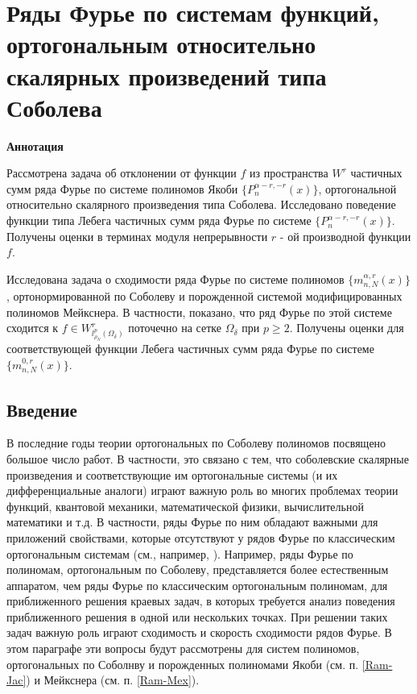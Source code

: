 \chapter{Ряды Фурье по системам функций, ортогональным относительно скалярных произведений типа Соболева}

\begin{center}
\textbf{ Аннотация}
\end{center}
Рассмотрена задача об отклонении от функции $f$ из пространства $W^r$ частичных сумм ряда Фурье по системе полиномов Якоби $\{P_n^{\alpha-r,-r}(x)\}$, ортогональной относительно скалярного произведения типа Соболева. Исследовано поведение функции типа Лебега частичных сумм ряда Фурье по системе $\{P_n^{\alpha-r,-r}(x)\}$. Получены оценки в терминах модуля непрерывности $r$ - ой производной функции $f$.

Исследована задача о сходимости ряда Фурье по системе полиномов $\{m_{n,N}^{\alpha,r}(x)\}$, ортонормированной по Соболеву и порожденной системой модифицированных полиномов Мейкснера. В частности, показано, что ряд Фурье по этой системе сходится к $f\in W^r_{l^p_{\rho_N}(\Omega_\delta)}$ поточечно на сетке $\Omega_\delta$ при $p\ge2$. Получены оценки для соответствующей функции Лебега частичных сумм ряда Фурье по системе $\{m_{n,N}^{0,r}(x)\}$.


\section*{Введение}

В последние годы теории ортогональных по Соболеву полиномов посвящено большое число работ. В частности, это связано с тем, что соболевские скалярные произведения и соответствующие им ортогональные системы (и их дифференциальные аналоги) играют важную роль во многих проблемах теории функций, квантовой механики, математической физики, вычислительной математики и т.д. В частности, ряды Фурье по ним обладают важными для приложений свойствами, которые отсутствуют у рядов Фурье по классическим ортогональным системам (см., например, \cite{Ram-Ba-Ra-Pe,Ram-Mar-Xu,Ram-Shar-UMN}).
Например, ряды Фурье по полиномам, ортогональным по Соболеву, представляется более естественным аппаратом, чем ряды Фурье по классическим ортогональным полиномам, для приближенного решения краевых задач, в которых требуется анализ поведения приближенного решения в одной или нескольких точках.
При решении таких задач важную роль играют сходимость и скорость сходимости рядов Фурье. В этом параграфе эти вопросы будут рассмотрены для систем полиномов, ортогональных по Соболнву и порожденных полиномами Якоби (см. п. \ref{Ram-Jac}) и Мейкснера (см. п. \ref{Ram-Mex}).

